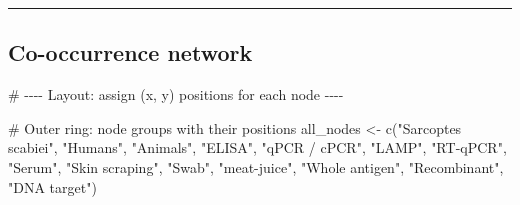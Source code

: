 \documentclass[
  letterpaper,
  DIV=11,
  numbers=noendperiod]{scrartcl}
\newenvironment{Shaded}{\begin{snugshade}}{\end{snugshade}}
\newcommand{\CommentTok}[1]{\textcolor[rgb]{0.37,0.37,0.37}{#1}}
\newcommand{\FunctionTok}[1]{\textcolor[rgb]{0.28,0.35,0.67}{#1}}
\newcommand{\NormalTok}[1]{\textcolor[rgb]{0.00,0.23,0.31}{#1}}
\newcommand{\OtherTok}[1]{\textcolor[rgb]{0.00,0.23,0.31}{#1}}
\newcommand{\StringTok}[1]{\textcolor[rgb]{0.13,0.47,0.30}{#1}}
\begin{document}
\begin{center}\rule{0.5\linewidth}{0.5pt}\end{center}

\subsection{Co-occurrence network}\label{co-occurrence-network}

\begin{Shaded}
\begin{Highlighting}[]
\CommentTok{\# {-}{-}{-}{-} Layout: assign (x, y) positions for each node {-}{-}{-}{-}}

\CommentTok{\# Outer ring: node groups with their positions}
\NormalTok{all\_nodes }\OtherTok{\textless{}{-}} \FunctionTok{c}\NormalTok{(}\StringTok{"Sarcoptes scabiei"}\NormalTok{,}
  \StringTok{"Humans"}\NormalTok{, }\StringTok{"Animals"}\NormalTok{,}
  \StringTok{"ELISA"}\NormalTok{, }\StringTok{"qPCR / cPCR"}\NormalTok{, }\StringTok{"LAMP"}\NormalTok{, }\StringTok{"RT{-}qPCR"}\NormalTok{,}
  \StringTok{"Serum"}\NormalTok{, }\StringTok{"Skin scraping"}\NormalTok{, }\StringTok{"Swab"}\NormalTok{, }\StringTok{"meat{-}juice"}\NormalTok{,}
  \StringTok{"Whole antigen"}\NormalTok{, }\StringTok{"Recombinant"}\NormalTok{, }\StringTok{"DNA target"}\NormalTok{)}


\end{Highlighting}
\end{Shaded}
\end{document}

